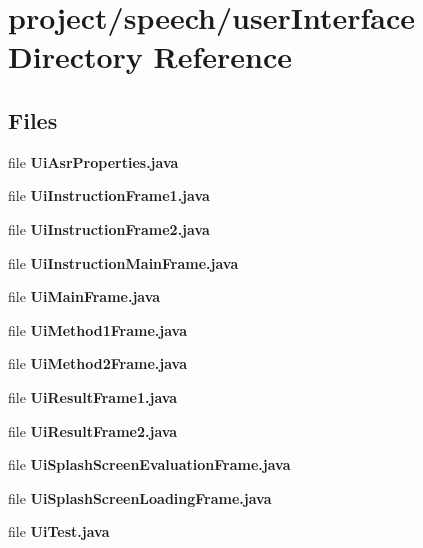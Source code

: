 \section{project/speech/user\+Interface Directory Reference}
\label{dir_0283843da58f612939ec43bb707c15e6}
\subsection*{Files}
\begin{DoxyCompactItemize}
\item 
file {\bf Ui\+Asr\+Properties.\+java}
\item 
file {\bf Ui\+Instruction\+Frame1.\+java}
\item 
file {\bf Ui\+Instruction\+Frame2.\+java}
\item 
file {\bf Ui\+Instruction\+Main\+Frame.\+java}
\item 
file {\bf Ui\+Main\+Frame.\+java}
\item 
file {\bf Ui\+Method1\+Frame.\+java}
\item 
file {\bf Ui\+Method2\+Frame.\+java}
\item 
file {\bf Ui\+Result\+Frame1.\+java}
\item 
file {\bf Ui\+Result\+Frame2.\+java}
\item 
file {\bf Ui\+Splash\+Screen\+Evaluation\+Frame.\+java}
\item 
file {\bf Ui\+Splash\+Screen\+Loading\+Frame.\+java}
\item 
file {\bf Ui\+Test.\+java}
\end{DoxyCompactItemize}
